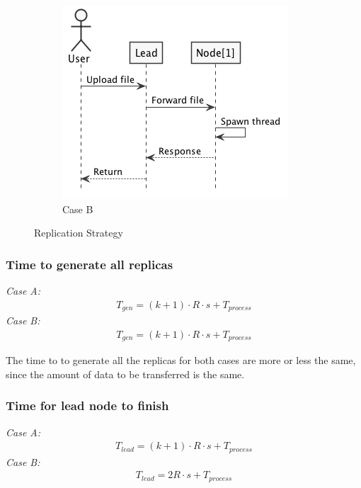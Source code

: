 \begin{figure}[H]
\begin{subfigure}{.42\textwidth}
        \includegraphics[width=\textwidth]{figures/e2b.png}
        \caption{Case B}
    \end{subfigure}
    \caption{Replication Strategy}
    \label{fig:repl}
\end{figure}

\subsubsection*{Time to generate all replicas}
\textit{Case A:} 
\begin{align} 
    T_{gen} = (k+1)\cdot R\cdot s + T_{process} \label{eq:e2_rep_A}
\end{align}
\textit{Case B:} 
\begin{align}
    T_{gen} = (k+1)\cdot R\cdot s + T_{process} \label{eq:e2_rep_B}
\end{align}

The time to to generate all the replicas for both cases are more or less the same, since the amount of data to be transferred is the same. 

\subsubsection*{Time for lead node to finish}
\textit{Case A:}
\begin{align} 
    T_{lead} = (k+1)\cdot R\cdot s + T_{process} \label{eq:e2_lead_A}
\end{align}
\textit{Case B:}
\begin{align} 
    T_{lead} = 2R \cdot s + T_{process} \label{eq:e2_lead_B}
\end{align}

